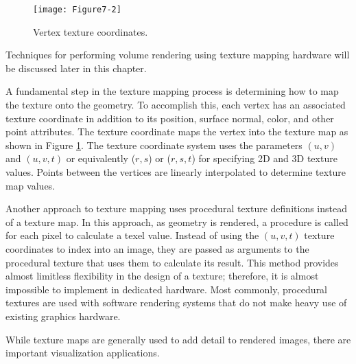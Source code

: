 \begin{figure}[!htb]
	\centering
	\texttt{[image: Figure7-2]}\\
	\caption{Vertex texture coordinates.}\label{fig:Figure7-2}
\end{figure}

Techniques for performing volume rendering using texture mapping hardware will be discussed later in this chapter.

A fundamental step in the texture mapping process is determining how to map the texture onto the geometry. To accomplish this, each vertex has an associated texture coordinate in addition to its position, surface normal, color, and other point attributes. The texture coordinate maps the vertex into the texture map as shown in Figure \ref{fig:Figure7-2}. The texture coordinate system uses the parameters $(u,v)$ and $(u,v,t)$ or equivalently ($r,s$) or ($r,s,t$) for specifying 2D and 3D texture values. Points between the vertices are linearly interpolated to determine texture map values.

Another approach to texture mapping uses procedural texture definitions instead of a texture map. In this approach, as geometry is rendered, a procedure is called for each pixel to calculate a texel value. Instead of using the $(u,v,t)$ texture coordinates to index into an image, they are passed as arguments to the procedural texture that uses them to calculate its result. This method provides almost limitless flexibility in the design of a texture; therefore, it is almost impossible to implement in dedicated hardware. Most commonly, procedural textures are used with software rendering systems that do not make heavy use of existing graphics hardware.

While texture maps are generally used to add detail to rendered images, there are important visualization applications.

